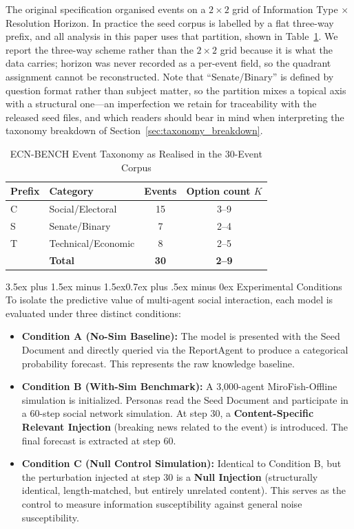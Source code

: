 \documentclass[11pt,journal,onecolumn]{IEEEtran}
\makeatletter
\renewcommand\subsection{\@startsection{subsection}{2}{\z@}%
  {3.5ex plus 1.5ex minus 1.5ex}{0.7ex plus .5ex minus 0ex}%
  {\normalfont\normalsize\bfseries}}
\makeatother
\begin{document}
The original specification organised events on a $2\times2$ grid of Information Type $\times$ Resolution Horizon. In practice the seed corpus is labelled by a flat three-way prefix, and all analysis in this paper uses that partition, shown in Table~\ref{tab:taxonomy}. We report the three-way scheme rather than the $2\times2$ grid because it is what the data carries; horizon was never recorded as a per-event field, so the quadrant assignment cannot be reconstructed. Note that ``Senate/Binary'' is defined by question format rather than subject matter, so the partition mixes a topical axis with a structural one---an imperfection we retain for traceability with the released seed files, and which readers should bear in mind when interpreting the taxonomy breakdown of Section~\ref{sec:taxonomy_breakdown}.

\begin{table}[!htbp]
\centering
\caption{ECN-BENCH Event Taxonomy as Realised in the 30-Event Corpus}
\begin{tabular}{llcc}
\toprule
\textbf{Prefix} & \textbf{Category} & \textbf{Events} & \textbf{Option count $K$} \\
\midrule
C & Social/Electoral   & 15 & 3--9 \\
S & Senate/Binary      &  7 & 2--4 \\
T & Technical/Economic &  8 & 2--5 \\
\midrule
  & \textbf{Total}     & \textbf{30} & \textbf{2--9} \\
\bottomrule
\end{tabular}
\label{tab:taxonomy}
\end{table}

\subsection{Experimental Conditions}
To isolate the predictive value of multi-agent social interaction, each model is evaluated under three distinct conditions:
\begin{itemize}
    \item \textbf{Condition A (No-Sim Baseline):} The model is presented with the Seed Document and directly queried via the ReportAgent to produce a categorical probability forecast. This represents the raw knowledge baseline.
    \item \textbf{Condition B (With-Sim Benchmark):} A 3,000-agent MiroFish-Offline simulation is initialized. Personas read the Seed Document and participate in a 60-step social network simulation. At step 30, a \textbf{Content-Specific Relevant Injection} (breaking news related to the event) is introduced. The final forecast is extracted at step 60.
    \item \textbf{Condition C (Null Control Simulation):} Identical to Condition B, but the perturbation injected at step 30 is a \textbf{Null Injection} (structurally identical, length-matched, but entirely unrelated content). This serves as the control to measure information susceptibility against general noise susceptibility.
\end{itemize}
\end{document}
